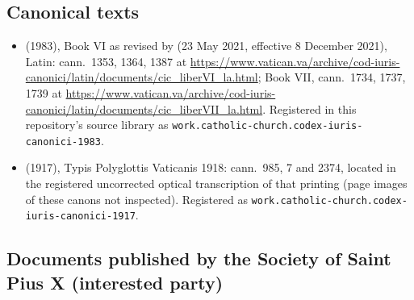 \subsection*{Canonical texts}

\begin{itemize}
\item {} (1983), Book VI as revised by
 (23 May 2021, effective 8 December 2021),
Latin: cann.~1353, 1364, 1387 at
\url{https://www.vatican.va/archive/cod-iuris-canonici/latin/documents/cic_liberVI_la.html};
Book VII, cann.~1734, 1737, 1739 at
\url{https://www.vatican.va/archive/cod-iuris-canonici/latin/documents/cic_liberVII_la.html}.
Registered in this repository's source library as
\texttt{work.catholic-church.codex-iuris-canonici-1983}.
\item {} (1917), Typis Polyglottis Vaticanis
1918: cann.~985, 7\textdegree{} and 2374, located in the registered
uncorrected optical transcription of that printing (page images of these
canons not inspected). Registered as
\texttt{work.catholic-church.codex-iuris-canonici-1917}.
\end{itemize}

\subsection*{Documents published by the Society of Saint Pius X
(interested party)}

